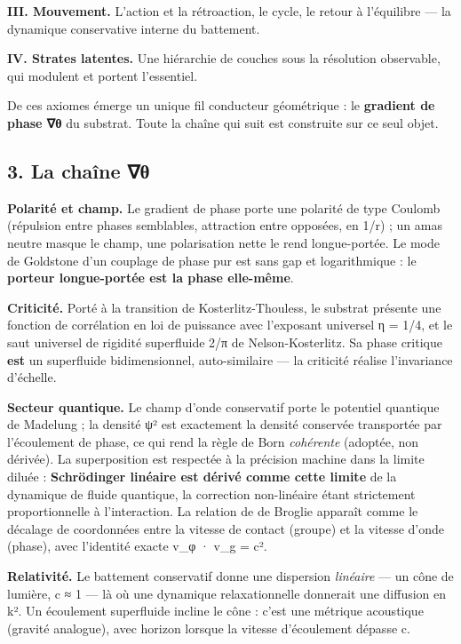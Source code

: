 \documentclass[11pt]{article}
\begin{document}
\textbf{III. Mouvement.} L'action et la rétroaction, le cycle, le retour
à l'équilibre --- la dynamique conservative interne du battement.

\textbf{IV. Strates latentes.} Une hiérarchie de couches sous la
résolution observable, qui modulent et portent l'essentiel.

De ces axiomes émerge un unique fil conducteur géométrique : le
\textbf{gradient de phase ∇θ} du substrat. Toute la chaîne qui suit est
construite sur ce seul objet.

\hypertarget{la-chauxeene-ux3b8}{%
\subsection{3. La chaîne ∇θ}\label{la-chauxeene-ux3b8}}

\textbf{Polarité et champ.} Le gradient de phase porte une polarité de
type Coulomb (répulsion entre phases semblables, attraction entre
opposées, en 1/r) ; un amas neutre masque le champ, une polarisation
nette le rend longue-portée. Le mode de Goldstone d'un couplage de phase
pur est sans gap et logarithmique : le \textbf{porteur longue-portée est
la phase elle-même}.

\textbf{Criticité.} Porté à la transition de Kosterlitz-Thouless, le
substrat présente une fonction de corrélation en loi de puissance avec
l'exposant universel η = 1/4, et le saut universel de rigidité
superfluide 2/π de Nelson-Kosterlitz. Sa phase critique \textbf{est} un
superfluide bidimensionnel, auto-similaire --- la criticité réalise
l'invariance d'échelle.

\textbf{Secteur quantique.} Le champ d'onde conservatif porte le
potentiel quantique de Madelung ; la densité \textbar ψ\textbar² est
exactement la densité conservée transportée par l'écoulement de phase,
ce qui rend la règle de Born \emph{cohérente} (adoptée, non dérivée). La
superposition est respectée à la précision machine dans la limite diluée
: \textbf{Schrödinger linéaire est dérivé comme cette limite} de la
dynamique de fluide quantique, la correction non-linéaire étant
strictement proportionnelle à l'interaction. La relation de de Broglie
apparaît comme le décalage de coordonnées entre la vitesse de contact
(groupe) et la vitesse d'onde (phase), avec l'identité exacte v\_φ ·
v\_g = c².

\textbf{Relativité.} Le battement conservatif donne une dispersion
\emph{linéaire} --- un cône de lumière, c ≈ 1 --- là où une dynamique
relaxationnelle donnerait une diffusion en k². Un écoulement superfluide
incline le cône : c'est une métrique acoustique (gravité analogue), avec
horizon lorsque la vitesse d'écoulement dépasse c.
\end{document}

